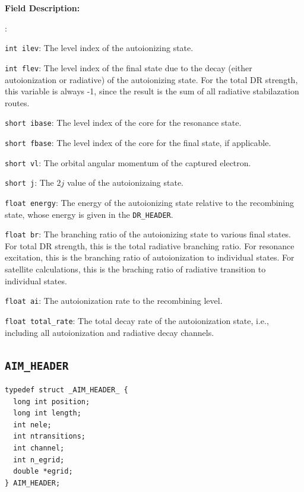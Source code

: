 \documentclass[twoside,letterpaper]{refrep}
\newenvironment{dbdesc}{\textbf{Field Description:} \begin{list}
	{:}{\setlength{\labelwidth}{2in}
	   \setlength{\leftmargin}{2in}
	   \setlength{\labelsep}{0.1in}
	   \setlength{\rightmargin}{0.2in}}}
	{\end{list}}
\begin{document}
\begin{dbdesc}
\item[\texttt{int ilev}:] The level index of the autoionizing state.
\item[\texttt{int flev}:] The level index of the final state due to the decay
(either autoionization or radiative) of the autoionizing state. For the total
DR strength, this variable is always -1, since the result is the sum of all
radiative stabilazation routes.
\item[\texttt{short ibase}:] The level index of the core for the resonance
state. 
\item[\texttt{short fbase}:] The level index of the core for the final
state, if applicable.
\item[\texttt{short vl}:] The orbital angular momentum of the captured
electron. 
\item[\texttt{short j}:] The $2j$ value of the autoionizaing state.
\item[\texttt{float energy}:] The energy of the autoionizing state relative to
the recombining state, whose energy is given in the \texttt{DR\_HEADER}.
\item[\texttt{float br}:] The branching ratio of the autoionizing state to
various final states. For total DR strength, this is the total radiative
branching ratio. For resonance excitation, this is the branching ratio of
autoionization to individual states. For satellite calculations, this is the
braching ratio of radiative transition to individual states.
\item[\texttt{float ai}:] The autoionization rate to the recombining level.
\item[\texttt{float total\_rate}:] The total decay rate of the autoionization
state, i.e., including all autoionization and radiative decay channels.
\end{dbdesc}

\subsection{\texttt{AIM\_HEADER}}
\begin{verbatim}
typedef struct _AIM_HEADER_ {
  long int position;
  long int length;
  int nele;
  int ntransitions;
  int channel;
  int n_egrid;
  double *egrid;
} AIM_HEADER;
\end{verbatim}
\end{document}
